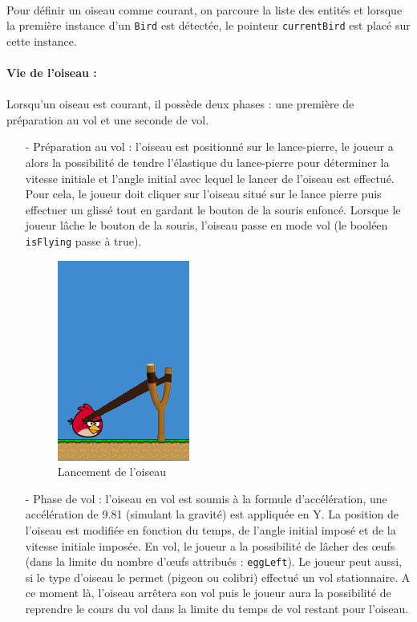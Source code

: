 \documentclass[a4paper,12pt]{report}
\begin{document}
\paragraph{}Pour définir un oiseau comme courant, on parcoure la liste des entités et lorsque la première instance d'un \verb+Bird+ est détectée, le pointeur \verb+currentBird+ est placé sur cette instance.

\paragraph{Vie de l'oiseau :}

\paragraph{}Lorsqu'un oiseau est courant, il possède deux phases : une première de préparation au vol et une seconde de vol.

\begin{itemize}
\item[-]Préparation au vol : l'oiseau est positionné sur le lance-pierre, le joueur a alors la possibilité de tendre l’élastique du lance-pierre pour  déterminer la vitesse initiale et l'angle initial avec lequel le lancer de l'oiseau est effectué. Pour cela, le joueur doit cliquer sur l'oiseau situé sur le lance pierre puis effectuer un glissé tout en gardant le bouton de la souris enfoncé. Lorsque le joueur lâche le bouton de la souris, l'oiseau passe en mode vol (le booléen \verb+isFlying+ passe à true).
\begin{figure}[H]
\begin{center}
\includegraphics[scale=0.9]{images/oiseautendu.png} 
\end{center}
\caption{Lancement de l'oiseau}
\label{Lancement de l'oiseau}
\end{figure}
\item[-]Phase de vol : l'oiseau en vol est soumis à la formule d’accélération, une accélération de 9.81 (simulant la gravité) est appliquée en Y. La position de l'oiseau est modifiée en fonction du temps, de l'angle initial imposé et de la vitesse initiale imposée. En vol, le joueur a la possibilité de lâcher des œufs (dans la limite du nombre d’œufs attribués : \verb+eggLeft+). Le joueur peut aussi, si le type d'oiseau le permet (pigeon ou colibri) effectué un vol stationnaire. A ce moment là, l'oiseau arrêtera son vol puis le joueur aura la possibilité de reprendre le cours du vol  dans la limite du temps de vol restant pour l'oiseau.
\end{itemize}
\end{document}
